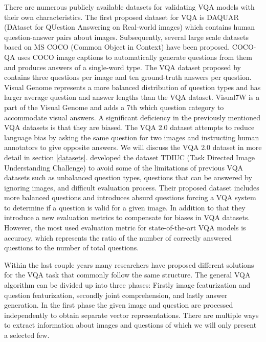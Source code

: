 \documentclass{article}
\begin{document}
There are numerous publicly available datasets for validating VQA models with their own characteristics. The first proposed dataset for VQA is DAQUAR (DAtaset for QUestion Answering on Real-world images) \citep{malinowski2014vqa} which contains human question-answer pairs about images. Subsequently, several large scale datasets based on MS COCO (Common Object in Context) \citep{lin2014microsoft} have been proposed. COCO-QA \cite{ren2015exploring} uses COCO image captions to automatically generate questions from them and produces answers of a single-word type. The VQA dataset proposed by \cite{antol2015vqa} contains three questions per image and ten ground-truth answers per question. Visual Genome \citep{krishnavisualgenome} represents a more balanced distribution of question types and has larger average question and answer lengths than the VQA dataset. Visual7W \citep{zhu2016cvpr} is a part of the Visual Genome and adds a 7th which question category to accommodate visual answers. A significant deficiency in the previously mentioned VQA datasets is that they are biased. The VQA 2.0 dataset \citep{goyal2017vqa2} attempts to reduce language bias by asking the same question for two images and instructing human annotators to give opposite answers. We will discuss the VQA 2.0 dataset in more detail in section \ref{datasets}. \cite{kafle2017tdiuc} developed the dataset TDIUC (Task Directed Image Understanding Challenge) to avoid some of the limitations of previous VQA datasets such as unbalanced question types, questions that can be answered by ignoring images, and difficult evaluation process. Their proposed dataset includes more balanced questions and introduces absurd questions forcing a VQA system to determine if a question is valid for a given image. In addition to that they introduce a new evaluation metrics to compensate for biases in VQA datasets. However, the most used evaluation metric for state-of-the-art VQA models is accuracy, which represents the ratio of the number of correctly answered questions to the number of total questions.

Within the last couple years many researchers have proposed different solutions for the VQA task that commonly follow the same structure. The general VQA algorithm can be divided up into three phases: Firstly image featurization and question featurization, secondly joint comprehension, and lastly answer generation.
In the first phase the given image and question are processed independently to obtain separate vector representations. There are multiple ways to extract information about images and questions of which we will only present a selected few.
\end{document}
